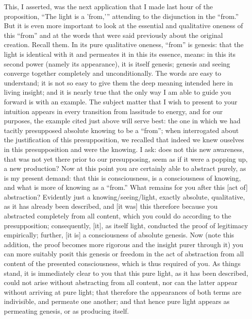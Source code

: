 This, I asserted, was the next application
that I made last hour of the proposition,
“The light is a 'from,'” attending to
the disjunction in the “from.”
But it is even more important to look at
the essential and qualitative oneness of this “from”
and at the words that were said previously
about the original creation.
Recall them.
In its pure qualitative oneness,
“from” is genesis:
that the light is identical with it
and permeates it in this its essence, means:
in this its second power (namely its appearance),
it is itself genesis;
genesis and seeing converge together
completely and unconditionally.
The words are easy to understand;
it is not so easy to give them the deep meaning
intended here in living insight;
and it is nearly true that the only way
I am able to guide you forward is with an example.
The subject matter that I wish to
present to your intuition appears
in every transition from lassitude to energy,
and for our purposes,
the example cited just above will serve best:
the one in which we had tacitly presupposed
absolute knowing to be a “from”;
when interrogated about the justification
of this presupposition,
we recalled that indeed we knew ouselves
in this presupposition and were the knowing.
I ask:
does not this new awareness,
that was not yet there prior to our presupposing,
seem as if it were a popping up, a new production?
Now at this point you are
certainly able to abstract purely,
as is my present demand:
that this is consciousness,
is a consciousness of knowing,
and what is more of knowing as a “from.”
What remains for you after this [act of] abstraction?
Evidently just a knowing/seeing/light,
exactly absolute, qualitative,
as it has already been described,
and [it was] this therefore because
you abstracted completely from all content,
which you could do according to the presupposition;
consequently, [it], as itself light, conducted
the proof of legitimacy empirically;
further, [it is] a consciousness of absolute genesis.
Now (note this addition, the proof becomes more rigorous
and the insight purer through it)
you can more suitably posit this genesis or freedom
in the act of abstraction from all content
of the presented consciousness,
which is thus required of you.
As things stand, it is immediately clear to you
that this pure light, as it has been described,
could not arise without abstracting from all content,
nor can the latter appear without arriving at pure light;
that therefore the appearances of both terms are indivisible,
and permeate one another;
and that hence pure light appears as permeating genesis,
or as producing itself.
